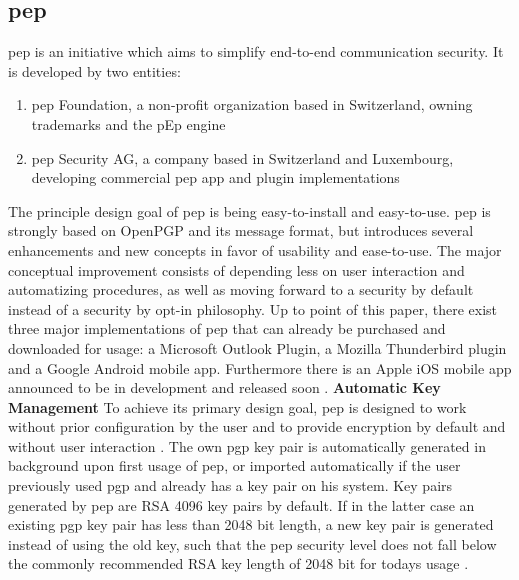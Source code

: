 \subsection{\acrlong{pep}}
\label{chap:analysis-pep}
\acrfull{pep} is an initiative which aims to simplify end-to-end communication security. It is developed by two entities:
\begin{enumerate}
	\item \acrshort{pep} Foundation, a non-profit organization based in Switzerland, owning trademarks and the pEp engine
	\item \acrshort{pep} Security AG, a company based in Switzerland and Luxembourg, developing commercial \acrshort{pep} app and plugin implementations
\end{enumerate}
The principle design goal of \acrshort{pep} is being easy-to-install and easy-to-use. \acrshort{pep} is strongly based on OpenPGP and its message format, but introduces several enhancements and new concepts in favor of usability and ease-to-use. The major conceptual improvement consists of depending less on user interaction and automatizing procedures, as well as moving forward to a security by
default instead of a security by opt-in philosophy. Up to point of this paper, there exist three major implementations of \acrshort{pep} that can already be
purchased and downloaded for usage: a Microsoft Outlook Plugin, a Mozilla Thunderbird plugin and a Google Android mobile app. Furthermore there is an Apple iOS mobile app announced to be in development and released soon \cite{pep-whitepaper}.
\newline
\newline
\textbf{Automatic Key Management}\newline
To achieve its primary design goal, \acrshort{pep} is designed to work without prior configuration by the user and to provide encryption by default and without user interaction \cite{pep-whitepaper}. The own \acrshort{pgp} key pair is automatically generated in background upon first usage of \acrshort{pep}, or imported automatically if the user previously used \acrshort{pgp} and already has a key pair on his system. Key pairs generated by \acrshort{pep} are RSA 4096 key pairs by default. If in the latter case an existing \acrshort{pgp} key pair has less than 2048 bit length, a new key pair is generated instead of using the old key, such that the \acrshort{pep} security level does not fall below the commonly recommended RSA key length of 2048 bit for todays usage \cite{pep-email-format-protocols}.

